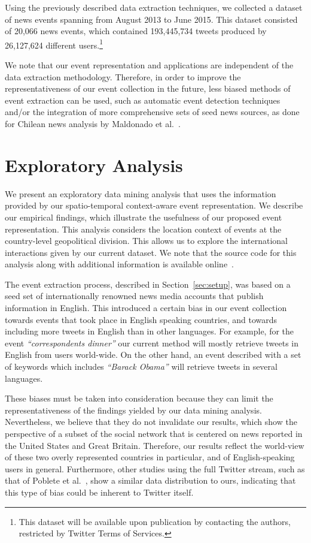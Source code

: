  Using the previously described data extraction techniques, we
collected a dataset of news events spanning from August 2013 to June
2015.  This dataset consisted of 20,066 news events, which contained
193,445,734 tweets produced by 26,127,624 different users.\footnote{This
dataset will be available upon publication by contacting the authors, restricted
by Twitter Terms of Services.}

We note that our event representation and applications are independent of the
data extraction methodology.  Therefore, in order to improve the
representativeness of our event collection in the future, less biased
methods of event extraction can be used, such as automatic event
detection techniques~\cite{Metzler_2012, Choi_2012} and/or the
integration of more comprehensive sets of seed news sources, as done
for Chilean news analysis by Maldonado et al.~\cite{maldonado_2015}.

\section{Exploratory Analysis}\label{sec:mining}

We present an exploratory data mining analysis that uses the
information provided by our spatio-temporal context-aware
event representation.  We describe our empirical findings, which
illustrate the usefulness of our proposed event representation.  This
analysis considers the location context of events at the country-level
geopolitical division.  This allows us to explore the international 
interactions given by our current dataset.  We note that the
source code for this analysis along with additional information is available
online~\cite{explo_analysis}.

The event extraction process, described in Section~\ref{sec:setup},
was based on a seed set of internationally renowned news media
accounts that publish information in English. This introduced a certain bias in our event
collection towards events that took place in English speaking countries, and
towards including more tweets in English than in other languages. For example, for the event
{\it ``correspondents dinner''} our current method will mostly retrieve
tweets in English from users world-wide. On the other hand, an event
described with a set of keywords which includes {\it ``Barack Obama''} will
retrieve tweets in several languages. 

These biases must be taken into consideration because they can limit the 
representativeness of the findings yielded by our data mining analysis. 
Nevertheless, we believe that they do not invalidate our results, 
which show the perspective of a subset of the social network 
that is centered on news reported in the United States and Great Britain. 
Therefore, our results reflect the world-view of these two 
overly represented countries in particular, and of English-speaking users in general.  
Furthermore, other studies using the full Twitter stream, such as that 
of Poblete et al.~\cite{Poblete:2011:BTS:2063576.2063724}, show a similar data
distribution to ours, indicating that this type of bias could be inherent to
Twitter itself.

